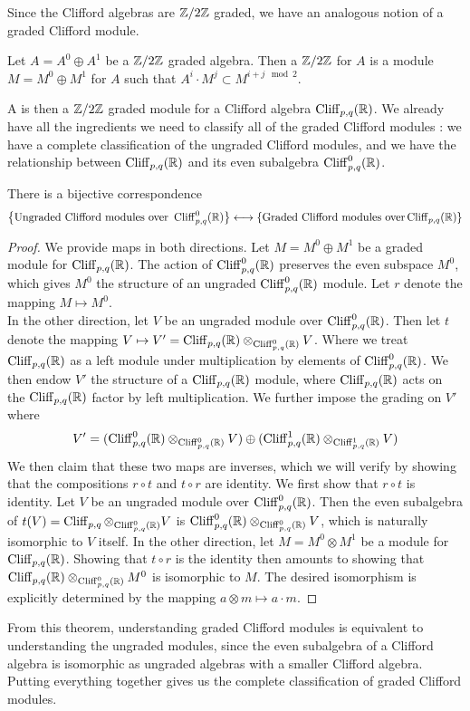 Since the Clifford algebras are $\mathbb{Z}/2\mathbb{Z}$ graded, we have an analogous notion
of a graded Clifford module.
%
\begin{defn}
Let $A = A^0 \oplus A^1$ be a $\mathbb{Z}/2\mathbb{Z}$ graded algebra. Then a $\mathbb{Z}/2\mathbb{Z}$
 for $A$ is a module $M = M^0 \oplus M^1$ for $A$ such that
$A^i \cdot M^j \subset M^{i + j \mod 2}$.
\end{defn}
%
A  is then a $\mathbb{Z}/2\mathbb{Z}$ graded module for a Clifford
algebra $\operatorname{Cliff}_{p,q}(\mathbb{R})$. We already have all the ingredients we need
to classify all of the graded Clifford modules : we have a complete
classification of the ungraded Clifford modules, and we have the relationship
between $\operatorname{Cliff}_{p,q}(\mathbb{R})$ and its even subalgebra $\operatorname{Cliff}_{p,q}^0(\mathbb{R})$.
%
\begin{thm}
There is a bijective correspondence
\[
\left\lbrace \text{Ungraded Clifford modules over } \operatorname{Cliff}_{p,q}^0(\mathbb{R}) \right\rbrace \longleftrightarrow
\left\lbrace \text{Graded Clifford modules over} \operatorname{Cliff}_{p,q}(\mathbb{R}) \right\rbrace
\]
\end{thm}
%
\begin{proof}
We provide maps in both directions. Let $M = M^0 \oplus M^1$ be a graded
module for $\operatorname{Cliff}_{p,q}(\mathbb{R})$. The action of $\operatorname{Cliff}_{p,q}^0(\mathbb{R})$ preserves
the even subspace $M^0$, which gives $M^0$ the structure of an ungraded
$\operatorname{Cliff}_{p,q}^0(\mathbb{R})$ module. Let $r$ denote the mapping $M \mapsto M^0$. \\

In the other direction, let $V$ be an ungraded module over $\operatorname{Cliff}_{p,q}^0(\mathbb{R})$.
Then let $t$ denote the mapping
$V \mapsto V' = \operatorname{Cliff}_{p,q}(\mathbb{R}) \otimes_{\operatorname{Cliff}_{p,q}^0(\mathbb{R})} V$.
Where we treat $\operatorname{Cliff}_{p,q}(\mathbb{R})$ as a left module under multiplication by
elements of $\operatorname{Cliff}_{p,q}^0(\mathbb{R})$. We then endow $V'$ the structure of a
$\operatorname{Cliff}_{p,q}(\mathbb{R})$ module, where $\operatorname{Cliff}_{p,q}(\mathbb{R})$ acts on the $\operatorname{Cliff}_{p,q}(\mathbb{R})$
factor by left multiplication. We further impose the grading on $V'$ where
\[
V' = ( \operatorname{Cliff}^0_{p,q}(\mathbb{R}) \otimes_{\operatorname{Cliff}^0_{p,q}(\mathbb{R})} V) \oplus
(\operatorname{Cliff}^1_{p,q}(\mathbb{R}) \otimes_{\operatorname{Cliff}^1_{p,q}(\mathbb{R})} V)
\]
We then claim that these two maps are inverses, which we will verify by showing
that the compositions $r \circ t$ and $t \circ r$ are identity. We first show
that $r \circ t$ is identity. Let $V$ be an ungraded module over $\operatorname{Cliff}_{p,q}^0(\mathbb{R})$.
Then the even subalgebra of $t(V) = \operatorname{Cliff}_{p,q} \otimes_{\operatorname{Cliff}_{p,q}^0(\mathbb{R})} V$
is $\operatorname{Cliff}^0_{p,q}(\mathbb{R}) \otimes_{\operatorname{Cliff}^0_{p,q}(\mathbb{R})} V$, which is naturally isomorphic
to $V$ itself. In the other direction, let $M = M^0 \otimes M^1$ be a module for
$\operatorname{Cliff}_{p,q}(\mathbb{R})$. Showing that $t \circ r$ is the identity then amounts to showing
that $\operatorname{Cliff}_{p,q}(\mathbb{R}) \otimes_{\operatorname{Cliff}_{p,q}^0(\mathbb{R})} M^0$ is isomorphic to $M$.
The desired isomorphism is explicitly determined by the mapping
$a \otimes m \mapsto a \cdot m$.
\end{proof}
%
From this theorem, understanding graded Clifford modules is equivalent to understanding
the ungraded modules, since the even subalgebra of a Clifford algebra is isomorphic
as ungraded algebras with a smaller Clifford algebra. Putting everything together
gives us the complete classification of graded Clifford modules.\\

